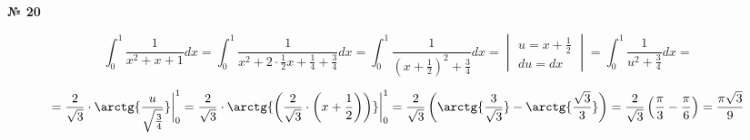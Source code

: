 \documentclass{article}
\begin{document}
\textbf{№ 20} 

$$ \int_{0}^{1} \frac{1}{x^2+x+1} dx 
= \int_{0}^{1} \frac{1}{x^2+2 \cdot \frac{1}{2}x + \frac{1}{4} + \frac{3}{4}} dx 
= \int_{0}^{1} \frac{1}{(x + \frac{1}{2})^2 + \frac{3}{4}} dx 
= \begin{vmatrix} u = x + \frac{1}{2} \\
                 du = dx \end{vmatrix} 
= \int_{0}^{1} \frac{1}{u^2 + \frac{3}{4}} dx 
= $$

$$ = \frac{2}{\sqrt{3}} \cdot \arctg{\frac{u}{\sqrt{\frac{3}{4}}}} \bigg\vert_{0}^{1} 
= \frac{2}{\sqrt{3}} \cdot \arctg{\left( \frac{2}{\sqrt{3}} \cdot \left( x+\frac{1}{2} \right) \right)} \bigg\vert_{0}^{1} 
= \frac{2}{\sqrt{3}} \left( \arctg{\frac{3}{\sqrt{3}}} - \arctg{\frac{\sqrt{3}}{3}} \right)
= \frac{2}{\sqrt{3}} \left( \frac{\pi}{3} - \frac{\pi}{6} \right)
= \frac{\pi\sqrt{3}}{9}$$
\end{document}
